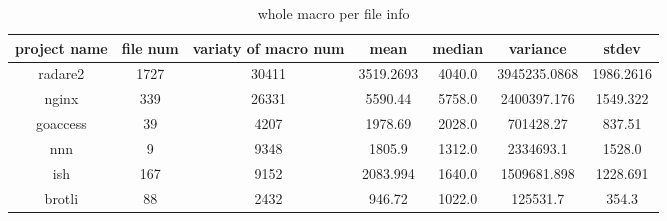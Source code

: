 \begin{table}[h]
	\caption{whole macro per file info}
	\label{table:whole_macro_info}	
		\begin{tabular}{ccccccc}
		\hline
		project name & file num & variaty of macro num & mean & median & variance & stdev \\ 
		\hline \hline
		radare2 & 1727 & 30411 & 3519.2693 & 4040.0 & 3945235.0868 & 1986.2616 \\ 
		\hline
		nginx & 339 & 26331 & 5590.44 & 5758.0 & 2400397.176 & 1549.322 \\ 
		\hline
		goaccess & 39 & 4207 & 1978.69 & 2028.0 & 701428.27 & 837.51 \\ 
		\hline
		nnn & 9 & 9348 & 1805.9 & 1312.0 & 2334693.1 & 1528.0 \\ 
		\hline
		ish & 167 & 9152 & 2083.994 & 1640.0 & 1509681.898 & 1228.691 \\ 
		\hline
		brotli & 88 & 2432 & 946.72 & 1022.0 & 125531.7 & 354.3 \\ 
		\hline
	\end{tabular}
\end{table}